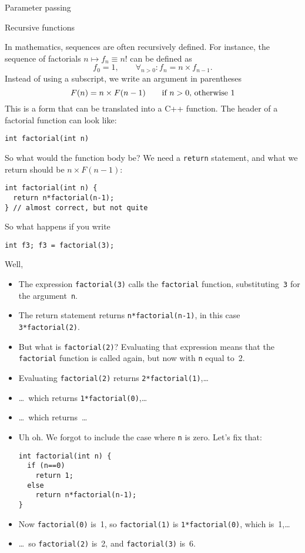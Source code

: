  {Parameter passing}
\label{sec:passing}


 {Recursive functions}
\label{sec:recursion}

In mathematics, sequences are often recursively defined. For instance,
the sequence of factorials $n\mapsto f_n\equiv n!$ can be defined as
\[ f_0=1,\qquad \forall_{n>0}\colon f_n=n\times f_{n-1}. \]
Instead of using a subscript, we write an argument in parentheses
\[ F(n) = n \times F(n-1) \qquad \hbox{if $n>0$, otherwise~$1$} \]
This is a form that can be translated into a C++ function.
The header of a factorial function can look like:
\begin{lstlisting}
int factorial(int n)
\end{lstlisting}
So what would the
function body be? We need a \lstinline{return} statement, and what we return
should be $n \times F(n-1)$:
\begin{lstlisting}
int factorial(int n) {
  return n*factorial(n-1);
} // almost correct, but not quite
\end{lstlisting}
So what happens if you write
\begin{lstlisting}
int f3; f3 = factorial(3);
\end{lstlisting}
Well,
\begin{itemize}
\item The expression \lstinline{factorial(3)} calls the \lstinline{factorial}
  function, substituting~\lstinline{3} for the argument~\lstinline{n}.
\item The return statement returns \lstinline{n*factorial(n-1)}, in this case
  \lstinline{3*factorial(2)}.
\item But what is \lstinline{factorial(2)}? Evaluating that expression means
  that the \lstinline{factorial} function is called again, but now with \lstinline{n}
  equal to~2.
\item Evaluating \lstinline{factorial(2)} returns \lstinline{2*factorial(1)},\ldots
\item \ldots~which returns \lstinline{1*factorial(0)},\ldots
\item \ldots~which returns~\ldots
\item Uh oh. We forgot to include the case where \lstinline{n} is zero. Let's
  fix that:
\begin{lstlisting}
int factorial(int n) {
  if (n==0)
    return 1;
  else
    return n*factorial(n-1);
}
\end{lstlisting}
\item Now \lstinline{factorial(0)} is~1, so \lstinline{factorial(1)} is
  \lstinline{1*factorial(0)}, which is~1,\ldots
\item \ldots~so \lstinline{factorial(2)} is~2, and \lstinline{factorial(3)} is~6.
\end{itemize}

